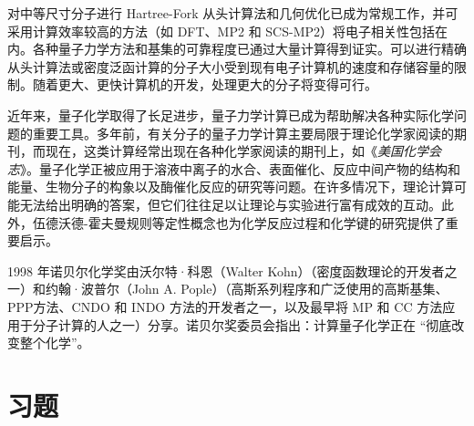 	对中等尺寸分子进行 Hartree-Fork 从头计算法和几何优化已成为常规工作，并可采用计算效率较高的方法（如 DFT、MP2 和 SCS-MP2）将电子相关性包括在内。各种量子力学方法和基集的可靠程度已通过大量计算得到证实。可以进行精确从头计算法或密度泛函计算的分子大小受到现有电子计算机的速度和存储容量的限制。随着更大、更快计算机的开发，处理更大的分子将变得可行。

	近年来，量子化学取得了长足进步，量子力学计算已成为帮助解决各种实际化学问 题的重要工具。多年前，有关分子的量子力学计算主要局限于理论化学家阅读的期刊，而现在，这类计算经常出现在各种化学家阅读的期刊上，如《\textit{美国化学会志}》。量子化学正被应用于溶液中离子的水合、表面催化、反应中间产物的结构和能量、生物分子的构象以及酶催化反应的研究等问题。在许多情况下，理论计算可能无法给出明确的答案，但它们往往足以让理论与实验进行富有成效的互动。此外，伍德沃德-霍夫曼规则等定性概念也为化学反应过程和化学键的研究提供了重要启示。
	
	1998 年诺贝尔化学奖由沃尔特·科恩（Walter Kohn）（密度函数理论的开发者之一）和约翰·波普尔（John A. Pople）（高斯系列程序和广泛使用的高斯基集、PPP方法、CNDO 和 INDO 方法的开发者之一，以及最早将 MP 和 CC 方法应用于分子计算的人之一）分享。诺贝尔奖委员会指出：计算量子化学正在 “彻底改变整个化学”。

\section*{习题}

